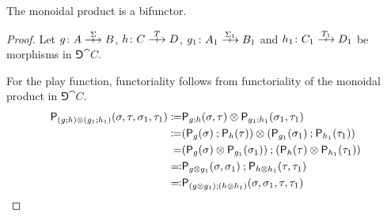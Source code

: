 \begin{lemma}
  The monoidal product is a bifunctor.
\end{lemma}
\begin{proof}
  Let \(g \colon A \gamearrow{\Sigma} B\), \(h \colon C \gamearrow{T} D\), \(g_1 \colon A_1 \gamearrow{\Sigma_1} B_1\) and \(h_1 \colon C_1 \gamearrow{T_1} D_1\) be morphisms in \(\Game{\cat{C}}\).

For the play function, functoriality follows from functoriality of the monoidal product in \(\Game{\cat{C}}\).
\begin{align*} \play{(g \dcomp h) \tensor (g_1 \dcomp h_1)}(\sigma,\tau,\sigma_1,\tau_1) \defn & \play{g \dcomp h}(\sigma,\tau) \otimes \play{g_1 \dcomp h_1}(\sigma_1,\tau_1) \\
\defn & (\play{g}(\sigma) \dcomp \play{h}(\tau)) \otimes (\play{g_1}(\sigma_1) \dcomp \play{h_1}(\tau_1)) \\
=& (\play{g}(\sigma) \tensor \play{g_1}(\sigma_1)) \dcomp (\play{h}(\tau) \tensor \play{h_1}(\tau_1)) \\
\codefn& \play{g \tensor g_1}(\sigma,\sigma_1) \dcomp \play{h \tensor h_1}(\tau,\tau_1) \\
\codefn& \play{(g \tensor g_1) \dcomp (h \tensor h_1)}(\sigma,\sigma_1,\tau,\tau_1) \\
\end{align*}


\end{proof}
